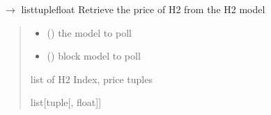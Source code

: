 \documentclass[letterpaper,10pt,english]{sphinxmanual}
\begin{document}
\begin{fulllineitems}
\label{\detokenize{src.integrator.utilities:src.integrator.utilities.poll_hydrogen_price}}
\pysigstartsignatures
\pysiglinewithargsret
{}
{\sphinxparamcomma {}}
{{ $\rightarrow$ list\DUrole{p}{{[}}tuple\DUrole{p}{{[}}{\hyperref[\detokenize{src.integrator.utilities:src.integrator.utilities.HI}]{\sphinxcrossref{HI}}}float\DUrole{p}{{]}}\DUrole{p}{{]}}}}
\pysigstopsignatures
\sphinxAtStartPar
Retrieve the price of H2 from the H2 model
\begin{quote}\begin{description}
\begin{itemize}
\item {} 
\sphinxAtStartPar
{} ({\hyperref[\detokenize{src.models.hydrogen.model.h2_model:src.models.hydrogen.model.h2_model.H2Model}]{}}) \textendash{} the model to poll

\item {} 
\sphinxAtStartPar
{} () \textendash{} block model to poll

\end{itemize}

\sphinxAtStartPar
list of H2 Index, price tuples

\sphinxAtStartPar
list{[}tuple{[}{\hyperref[\detokenize{src.integrator.utilities:src.integrator.utilities.HI}]{}}, float{]}{]}

\end{description}\end{quote}

\end{fulllineitems}

\end{document}
